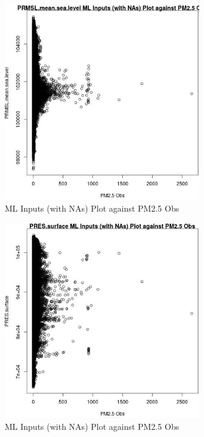 \begin{figure} 
\centering  
\includegraphics[width=0.77\textwidth]{Code_Outputs/Report_ML_input_PM25_Step4_part_e_de_duplicated_aves_compiled_2019-05-21wNAs_PRMSLmeansealevelvPM25_Obs.jpg} 
\caption{\label{fig:Report_ML_input_PM25_Step4_part_e_de_duplicated_aves_compiled_2019-05-21wNAsPRMSLmeansealevelvPM25_Obs}ML Inputs (with NAs) Plot against PM2.5 Obs} 
\end{figure} 
 

\begin{figure} 
\centering  
\includegraphics[width=0.77\textwidth]{Code_Outputs/Report_ML_input_PM25_Step4_part_e_de_duplicated_aves_compiled_2019-05-21wNAs_PRESsurfacevPM25_Obs.jpg} 
\caption{\label{fig:Report_ML_input_PM25_Step4_part_e_de_duplicated_aves_compiled_2019-05-21wNAsPRESsurfacevPM25_Obs}ML Inputs (with NAs) Plot against PM2.5 Obs} 
\end{figure} 
 

